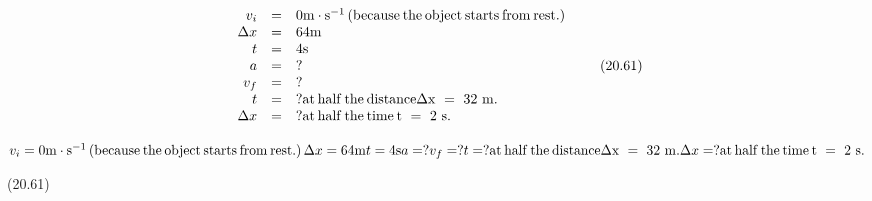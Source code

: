 {\begin{mdframed}[linewidth=4, leftmargin=40, rightmargin=40]
\begin{exercise}
\begin{enumerate}[noitemsep, label=\textbf{Step} \textbf{\arabic*}. ]
{\begin{equation}
    \begin{array}{ccc}\hfill {v}_{i}& =& 0\mathrm{m}\ensuremath{\cdot}{\mathrm{s}}^{-1}\left(\mathrm{because}\phantom{\rule{2pt}{0ex}}\mathrm{the}\phantom{\rule{2pt}{0ex}}\mathrm{object}\phantom{\rule{2pt}{0ex}}\mathrm{starts}\phantom{\rule{2pt}{0ex}}\mathrm{from}\phantom{\rule{2pt}{0ex}}\mathrm{rest.}\right)\hfill \\ \hfill \Delta x& =& 64\mathrm{m}\hfill \\ \hfill t& =& 4\mathrm{s}\hfill \\ \hfill a& =& ?\hfill \\ \hfill {v}_{f}& =& ?\hfill \\ \hfill t& =& ?\mathrm{at}\phantom{\rule{2pt}{0ex}}\mathrm{half}\phantom{\rule{2pt}{0ex}}\mathrm{the}\phantom{\rule{2pt}{0ex}}\mathrm{distance}\Delta \mathrm{x}\phantom{\rule{3.33333pt}{0ex}}=\phantom{\rule{3.33333pt}{0ex}}32\phantom{\rule{3.33333pt}{0ex}}\mathrm{m}.\hfill \\ \hfill \Delta x& =& ?\mathrm{at}\phantom{\rule{2pt}{0ex}}\mathrm{half}\phantom{\rule{2pt}{0ex}}\mathrm{the}\phantom{\rule{2pt}{0ex}}\mathrm{time}\phantom{\rule{2pt}{0ex}}\mathrm{t}\phantom{\rule{3.33333pt}{0ex}}=\phantom{\rule{3.33333pt}{0ex}}2\phantom{\rule{3.33333pt}{0ex}}\mathrm{s}.\hfill \end{array}\tag{20.61}
      \end{equation}
    }{%
    \setlength{\mymathboxwidth}{\columnwidth}
      \addtolength{\mymathboxwidth}{-48pt}
    \par\vspace{12pt}\noindent\begin{minipage}{\columnwidth}
    \parbox[t]{\mymathboxwidth}{\large\begin{math}
    {v}_{i}=0\mathrm{m}\ensuremath{\cdot}{\mathrm{s}}^{-1}\left(\mathrm{because}\phantom{\rule{2pt}{0ex}}\mathrm{the}\phantom{\rule{2pt}{0ex}}\mathrm{object}\phantom{\rule{2pt}{0ex}}\mathrm{starts}\phantom{\rule{2pt}{0ex}}\mathrm{from}\phantom{\rule{2pt}{0ex}}\mathrm{rest.}\right)\Delta x=64\mathrm{m}t=4\mathrm{s}a=?{v}_{f}=?t=?\mathrm{at}\phantom{\rule{2pt}{0ex}}\mathrm{half}\phantom{\rule{2pt}{0ex}}\mathrm{the}\phantom{\rule{2pt}{0ex}}\mathrm{distance}\Delta \mathrm{x}\phantom{\rule{3.33333pt}{0ex}}=\phantom{\rule{3.33333pt}{0ex}}32\phantom{\rule{3.33333pt}{0ex}}\mathrm{m}.\Delta x=?\mathrm{at}\phantom{\rule{2pt}{0ex}}\mathrm{half}\phantom{\rule{2pt}{0ex}}\mathrm{the}\phantom{\rule{2pt}{0ex}}\mathrm{time}\phantom{\rule{2pt}{0ex}}\mathrm{t}\phantom{\rule{3.33333pt}{0ex}}=\phantom{\rule{3.33333pt}{0ex}}2\phantom{\rule{3.33333pt}{0ex}}\mathrm{s}.\end{math}}\hfill
    \parbox[t]{48pt}{\raggedleft 
    (20.61)}
    \end{minipage}\vspace{12pt}\par
    }%
    

\end{enumerate}
\end{exercise}
\end{mdframed}}
